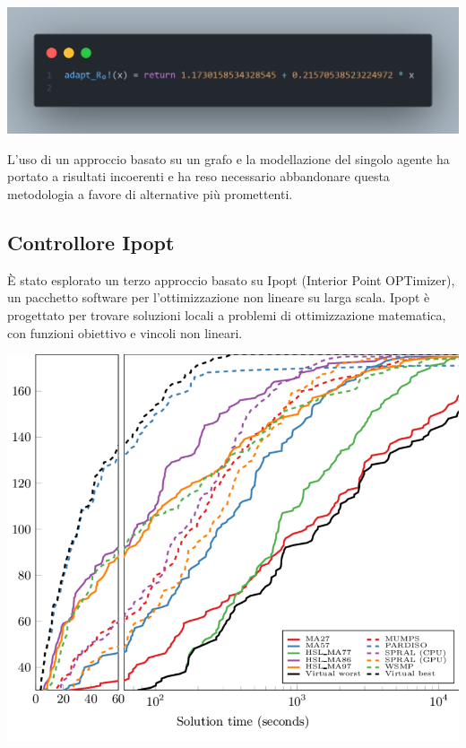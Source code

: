 \begin{minipage}{\linewidth}
    \centering
    \includegraphics[width=\textwidth]{img/rapporto_strano.png}
    \label{fig:strange_behaviour_R0}
\end{minipage}

L'uso di un approccio basato su un grafo e la modellazione del 
singolo agente ha portato a risultati incoerenti e ha reso necessario 
abbandonare questa metodologia a favore di alternative più promettenti.
\newpage

\subsection{Controllore Ipopt}

È stato esplorato un terzo approccio basato su Ipopt 
(Interior Point OPTimizer), un pacchetto software per l'ottimizzazione 
non lineare su larga scala. Ipopt è progettato per trovare soluzioni 
locali a problemi di ottimizzazione matematica, con funzioni obiettivo e 
vincoli non lineari. \cite{Wächter2006}

\begin{minipage}{\linewidth}
    \centering
    \includegraphics[width=\textwidth]{img/Comparison-of-Ipopt-performance-over-various-linear-solvers-using-the-two-dimensional.png}
    \label{fig:Ipopt_solver}
\end{minipage}

